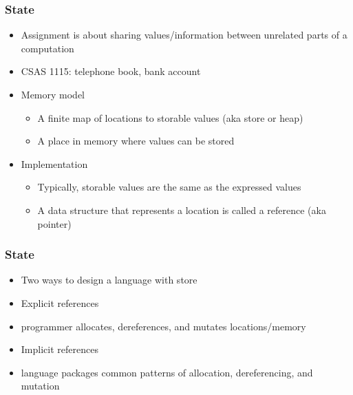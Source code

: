 \documentclass{beamer}
\begin{document}
\begin{frame}[fragile]
\frametitle{State}
\begin{scriptsize}
\begin{itemize}
\item<1-> Assignment is about sharing values/information between unrelated parts of a computation

\item<1-> CSAS 1115: telephone book, bank account

\item<2-> Memory model
\begin{itemize}
\item A finite map of locations to storable values (aka store or heap)

\item A place in memory where values can be stored
\end{itemize}

\item<3-> Implementation
\begin{itemize}
\item Typically, storable values are the same as the expressed values

\item A data structure that represents a location is called a reference (aka pointer)
\end{itemize}

\end{itemize}
\end{scriptsize}
\end{frame}

\begin{frame}[fragile]
\frametitle{State}
\begin{scriptsize}
\begin{itemize}
\item<1-> Two ways to design a language with store

\item<1-> Explicit references

\item<1-> programmer allocates, dereferences, and mutates locations/memory

\item<2-> Implicit references

\item<2-> language packages common patterns of allocation, dereferencing, and mutation

\end{itemize}
\end{scriptsize}
\end{frame}
\end{document}
